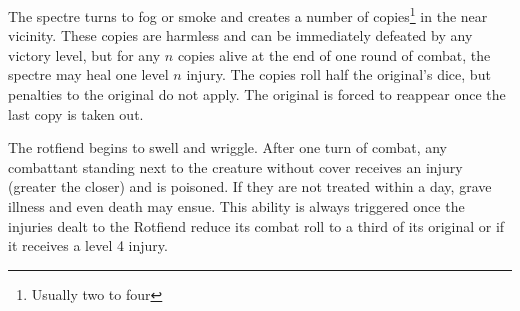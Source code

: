 {
    The spectre turns to fog or smoke and creates a number of copies\footnote{Usually two to four} in the near vicinity. These
    copies are harmless and can be immediately defeated by any victory level, but for any $n$ copies
    alive at the end of one round of combat, the spectre may heal one level $n$ injury. The copies
    roll half the original's dice, but penalties to the original do not apply. The original is forced
    to reappear once the last copy is taken out.
}

{
    The rotfiend begins to swell and wriggle. After one turn of combat, any combattant standing next to
    the creature without cover receives an injury (greater the closer) and is poisoned. If they are not
    treated within a day, grave illness and even death may ensue. This ability is always triggered once
    the injuries dealt to the Rotfiend reduce its combat roll to a third of its original or if it receives
    a level 4 injury.
}
